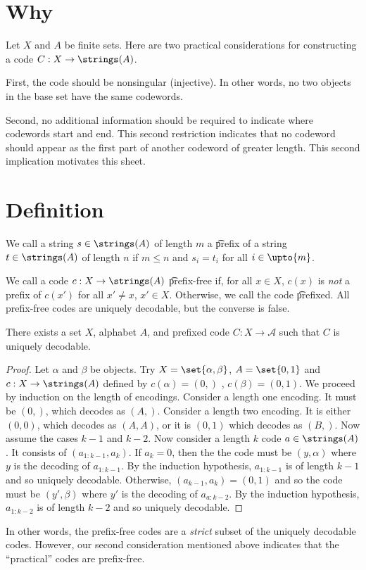 

\section*{Why}

Let $X$ and $A$ be finite sets.
Here are two practical considerations for constructing a code $C: X \to \strings(A)$.

First, the code should be nonsingular (injective).
In other words, no two objects in the base set have the same codewords.

Second, no additional information should be required to indicate where codewords start and end.
This second restriction indicates that no codeword should appear as the first part of another codeword of greater length.
This second implication motivates this sheet.

\section*{Definition}

We call a string $s \in \strings(A)$ of length $m$ a \t{prefix} of a string $t \in \strings(A)$ of length $n$ if $m \leq n$ and $s_i = t_i$ for all $i \in \upto{m}$.

We call a code $c: X \to \strings(A)$ \t{prefix-free} if, for all $x \in X$, $c(x)$ is \textit{not} a prefix of $c(x')$ for all $x' \neq x$, $x' \in X$.
Otherwise, we call the code \t{prefixed}.
All prefix-free codes are uniquely decodable, but the converse is false.

\begin{proposition}
There exists a set $X$, alphabet $A$, and prefixed code $C: X \to \mathcal{A} $ such that $C$ is uniquely decodable.
\end{proposition}

\begin{proof}Let $\alpha $ and $\beta $ be objects.
Try $X = \set{\alpha , \beta }$, $A = \set{0, 1}$ and $c: X \to \strings(A)$ defined by $c(\alpha ) = (0,)$ , $c(\beta ) = (0,1)$.
We proceed by induction on the length of encodings.
Consider a length one encoding.
It must be $(0,)$, which decodes as $(A,)$.
Consider a length two encoding.
It is either $(0,0)$, which decodes as $(A,A)$, or it is $(0,1)$ which decodes as $(B,)$.
Now assume the cases $k-1$ and $k-2$.
Now consider a length $k$ code $a \in \strings(A)$.
It consists of $(a_{1:k-1},a_k)$.
If $a_k = 0$, then the the code must be $(y, \alpha )$ where $y$ is the decoding of $a_{1:k-1}$.
By the induction hypothesis, $a_{1:k-1}$ is of length $k-1$ and so uniquely decodable.
Otherwise, $(a_{k-1}, a_k) = (0,1)$ and so the code must be $(y', \beta )$ where $y'$ is the decoding of $a_{a:k-2}$.
By the induction hypothesis, $a_{1:k-2}$ is of length $k-2$ and so uniquely decodable.\end{proof}
In other words, the prefix-free codes are a \textit{strict} subset of the uniquely decodable codes.
However, our second consideration mentioned above indicates that the ``practical'' codes are prefix-free.
